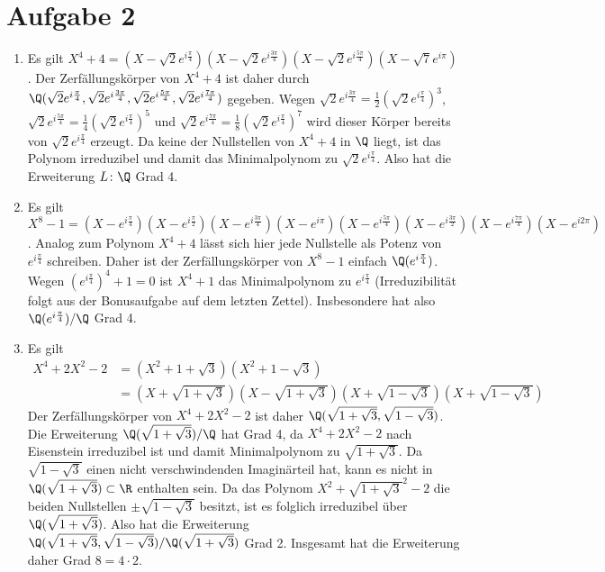 \documentclass{article}
\begin{document}
    \section*{Aufgabe 2}
    \begin{enumerate}
        \item Es gilt $X^4 + 4 = (X - \sqrt{2}e^{i\frac{\pi}{4}})(X - \sqrt{2}e^{i\frac{3\pi}{4}})(X - \sqrt{2}e^{i\frac{5\pi}{4}})(X -\sqrt{7}e^{i\pi})$.
        Der Zerfällungskörper von $X^4 + 4$ ist daher durch $\Q(\sqrt{2}e^{i\frac{\pi}{4}}, \sqrt{2}e^{i\frac{3\pi}{4}}, \sqrt{2}e^{i\frac{5\pi}{4}}, \sqrt{2}e^{i\frac{7\pi}{4}})$ gegeben.
        Wegen $\sqrt{2}e^{i\frac{3\pi}{4}} = \frac{1}{2}\left(\sqrt{2}e^{i\frac{\pi}{4}}\right)^3$, $\sqrt{2}e^{i\frac{5\pi}{4}} = \frac{1}{4}\left(\sqrt{2}e^{i\frac{\pi}{4}}\right)^5$ und
        $\sqrt{2}e^{i\frac{7\pi}{4}} = \frac{1}{8}\left(\sqrt{2}e^{i\frac{\pi}{4}}\right)^7$ wird dieser Körper bereits von $\sqrt{2}e^{i\frac{\pi}{4}}$ erzeugt. 
        Da keine der Nullstellen von $X^4 + 4$ in $\Q$ liegt, ist das Polynom irreduzibel und damit das Minimalpolynom zu $\sqrt{2}e^{i\frac{\pi}{4}}$. Also hat die Erweiterung $L \colon \Q$ Grad 4.
        \item Es gilt $X^8 - 1 = (X - e^{i\frac{\pi}{4}})(X - e^{i\frac{\pi}{2}})(X - e^{i\frac{3\pi}{4}})(X - e^{i\pi})(X - e^{i\frac{5\pi}{4}})(X - e^{i\frac{3\pi}{2}})(X - e^{i\frac{7\pi}{4}})(X - e^{i2\pi})$.
        Analog zum Polynom $X^4 + 4$ lässt sich hier jede Nullstelle als Potenz von $e^{i\frac{\pi}{4}}$ schreiben. Daher ist der Zerfällungskörper von $X^8 -1$ einfach $\Q(e^{i\frac{\pi}{4}})$. 
        Wegen $\left(e^{i\frac{\pi}{4}}\right)^4 + 1 = 0$ ist $X^4 + 1$ das Minimalpolynom zu $e^{i\frac{\pi}{4}}$ (Irreduzibilität folgt aus der Bonusaufgabe auf dem letzten Zettel).
        Insbesondere hat also $\Q(e^{i\frac{\pi}{4}}) / \Q$ Grad 4.
        \item Es gilt 
        \begin{align*}
            X^4 + 2X^2 - 2 &= (X^2 + 1 + \sqrt{3})(X^2 + 1 - \sqrt{3})\\
            &= (X + \sqrt{1 + \sqrt{3}})(X - \sqrt{1 + \sqrt{3}})(X + \sqrt{1 - \sqrt{3}})(X + \sqrt{1 - \sqrt{3}})
        \end{align*}
        Der Zerfällungskörper von $X^4 + 2X^2 - 2$ ist daher $\Q(\sqrt{1 + \sqrt{3}}, \sqrt{1 - \sqrt{3}})$. 
        Die Erweiterung $\Q(\sqrt{1 + \sqrt{3}})/\Q$ hat Grad 4, da $X^4 + 2X^2 -2$ nach Eisenstein irreduzibel ist und damit Minimalpolynom zu $\sqrt{1 + \sqrt{3}}$. 
        Da $\sqrt{1 - \sqrt{3}}$ einen nicht verschwindenden Imaginärteil hat, kann es nicht in $\Q(\sqrt{1 + \sqrt{3}}) \subset \R$ enthalten sein.
        Da das Polynom $X^2 + \sqrt{1 + \sqrt{3}}^2 - 2$ die beiden Nullstellen $\pm \sqrt{1 - \sqrt{3}}$ besitzt, ist es folglich irreduzibel über $\Q(\sqrt{1 + \sqrt{3}})$.
        Also hat die Erweiterung $\Q(\sqrt{1 + \sqrt{3}}, \sqrt{1 - \sqrt{3}}) / \Q(\sqrt{1 + \sqrt{3}})$ Grad 2. Insgesamt hat die Erweiterung daher Grad $8 = 4 \cdot 2$.
    \end{enumerate}
    
\end{document}
